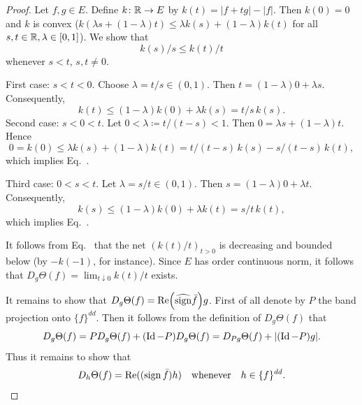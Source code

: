 \begin{proof}
Let $f, g \in E$. Define $k \colon \mathbb{R} \to E$ by $k(t) = |f+tg| - |f|$.
Then $k(0) = 0$ and $k$ is convex (\ie $k(\lambda s + (1-\lambda)t) \leq \lambda k(s) + (1-\lambda)k(t)$ for all $s, t \in \mathbb{R}, \lambda \in [0,1]$).
We show that
\begin{equation}\label{eq:c2-5.7}
k(s)/s \leq k(t)/t
\end{equation}
whenever $s < t$, $s,t \neq 0$.

First case: $s < t < 0$.
Choose $\lambda = t/s \in (0,1)$. 
Then $t = (1-\lambda)0 + \lambda s$. 
Consequently, 
\[
k(t) \leq (1-\lambda)k(0) + \lambda k(s) = t/s \, k(s) .
\]
Second case: $s < 0 < t$.
Let $0 < \lambda \coloneq t/(t-s) < 1$. 
Then $0 = \lambda s + (1-\lambda)t$. 
Hence 
\[
0 = k(0) \leq \lambda k(s) + (1-\lambda)k(t) = t/(t-s) \, k(s) - s/(t-s) \, k(t) ,
\]
which implies Eq.~.

Third case: $0 < s < t$.
Let $\lambda = s/t \in (0,1)$. Then $s = (1-\lambda)0 + \lambda t$. Consequently, 
\[
k(s) \leq (1-\lambda)k(0) + \lambda k(t) = s/t \, k(t) ,
\]
which implies Eq.~.

It follows from Eq.~ that the net $(k(t)/t)_{t>0}$ is decreasing and bounded below (by $-k(-1)$, for instance). Since $E$ has order continuous norm, it follows that $\displaystyle D_{g}\Theta(f) = \lim_{t \downarrow 0} k(t)/t$ exists.

It remains to show that $D_{g}\Theta(f) = \Re\mleft(\widehat{\sign}  \bar{f}\mright)g$.
First of all denote by $P$ the band projection onto $\{f\}^{dd}$. Then it
follows from the definition of\/ $D_{g}\Theta(f)$ that 
\[
D_{g}\Theta(f) = PD_{g}\Theta(f) + (\operatorname{Id}-P)D_{g}\Theta(f) = D_{Pg}\Theta(f) + |(\operatorname{Id}-P)g| .
\]
Thus it remains to show that
\begin{equation}\label{eq:c2-5.8}
D_{h}\Theta(f) = \mathop{}\!\mathrm{Re}((\operatorname{sign}  \bar{f})h) \quad \text{whenever} \quad h \in \{f\}^{dd}.
\end{equation}


\end{proof}
